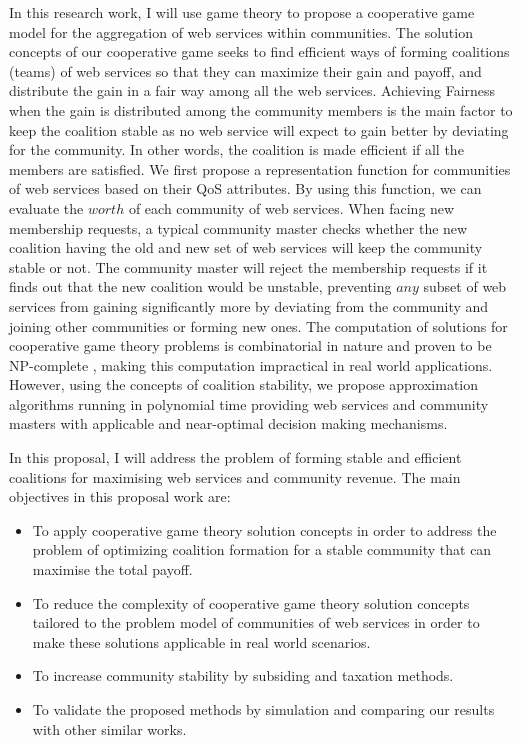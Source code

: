 In this research work, I will use game theory to
propose a cooperative game model for the aggregation of web
services within communities. The solution concepts of our
cooperative game seeks to find efficient ways of forming
coalitions (teams) of web services so that they can maximize their
gain and payoff, and distribute the gain in a fair way among all
the web services. Achieving Fairness when the gain is distributed
among the community members is the main factor to keep the
coalition stable as no web service will expect to gain better by
deviating for the community. In other words, the coalition is made
efficient if all the members are satisfied. We first propose a
representation function for communities of web services based on
their QoS attributes. By using this function, we can evaluate the
$worth$ of each community of web services. When facing new
membership requests, a typical community master checks whether the
new coalition having the old and new set of web services will keep
the community stable or not. The community master will reject the
membership requests if it finds out that the new coalition would
be unstable, preventing $any$ subset of web services from gaining
significantly more by deviating from the community and joining
other communities or forming new ones. The computation of
solutions for cooperative game theory problems is combinatorial in
nature and proven to be NP-complete \cite{Algorithmic}, making
this computation impractical in real world applications. However,
using the concepts of coalition stability, we propose
approximation algorithms running in polynomial time providing web
services and community masters with applicable and near-optimal
decision making mechanisms.

\indent In this proposal, I will address the problem of forming stable and efficient coalitions for maximising web services and community revenue.
The main objectives in this proposal work are:
\begin{itemize}
\item To apply cooperative game theory solution concepts in order to address the problem of optimizing coalition formation for a stable community that can maximise the total payoff.
\item To reduce the complexity of cooperative game theory solution concepts tailored to the problem model of communities of web services in order to make these solutions applicable in real world scenarios.
\item To increase community stability by subsiding and taxation methods.
\item To validate the proposed methods by simulation and comparing our results with other similar works.
\end{itemize}




